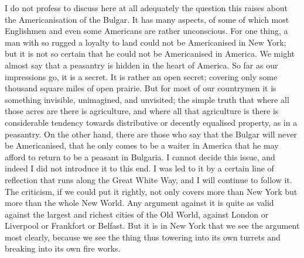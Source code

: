 \documentclass{book}
\begin{document}
I do not profess to discuss here at all adequately the question this raises about the Americanisation of the Bulgar. It has many aspects, of some of which most Englishmen and even some Americans are rather unconscious. For one thing, a man with so rugged a loyalty to land could not be Americanised in New York; but it is not so certain that he could not be Americanised in America. We might almost say that a peasantry is hidden in the heart of America. So far as our impressions go, it is a secret. It is rather an open secret; covering only some thousand square miles of open prairie. But for most of our countrymen it is something invisible, unimagined, and unvisited; the simple truth that where all those acres are there is agriculture, and where all that agriculture is there is considerable tendency towards distributive or decently equalised property, as in a peasantry. On the other hand, there are those who say that the Bulgar will never be Americanised, that he only comes to be a waiter in America that he may afford to return to be a peasant in Bulgaria. I cannot decide this issue, and indeed I did not introduce it to this end. I was led to it by a certain line of reflection that runs along the Great White Way, and I will continue to follow it. The criticism, if we could put it rightly, not only covers more than New York but more than the whole New World. Any argument against it is quite as valid against the largest and richest cities of the Old World, against London or Liverpool or Frankfort or Belfast. But it is in New York that we see the argument most clearly, because we see the thing thus towering into its own turrets and breaking into its own fire works.
\end{document}
